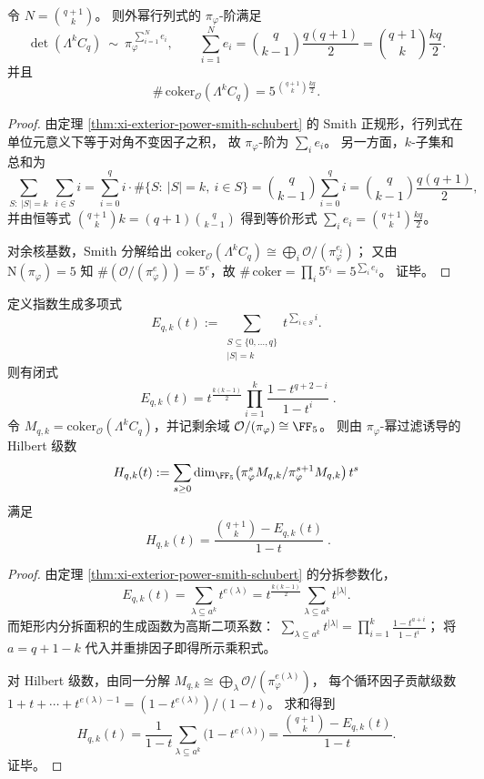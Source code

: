 \begin{proposition}[外幂行列式指数与余核基数]\label{prop:xi-exterior-power-det-coker-size}
令 \(N=\binom{q+1}{k}\)。
则外幂行列式的 \(\pi_\varphi\)-阶满足
\[
\det(\Lambda^k C_q)\ \sim\ \pi_\varphi^{\,\sum_{i=1}^{N}e_i},
\qquad
\sum_{i=1}^{N}e_i=\binom{q}{k-1}\frac{q(q+1)}{2}
=\binom{q+1}{k}\frac{kq}{2}.
\]
并且
\[
\#\,\mathrm{coker}_{\mathcal O}(\Lambda^k C_q)=5^{\,\binom{q+1}{k}\frac{kq}{2}}.
\]
\end{proposition}
\begin{proof}
由定理 \ref{thm:xi-exterior-power-smith-schubert} 的 Smith 正规形，行列式在单位元意义下等于对角不变因子之积，
故 \(\pi_\varphi\)-阶为 \(\sum_i e_i\)。
另一方面，\(k\)-子集和总和为
\[
\sum_{S:\ |S|=k}\ \sum_{i\in S} i
=\sum_{i=0}^{q} i\cdot \#\{S:\ |S|=k,\ i\in S\}
=\binom{q}{k-1}\sum_{i=0}^{q} i
=\binom{q}{k-1}\frac{q(q+1)}{2},
\]
并由恒等式 \(\binom{q+1}{k}k=(q+1)\binom{q}{k-1}\) 得到等价形式
\(\sum_i e_i=\binom{q+1}{k}\frac{kq}{2}\)。
\par
对余核基数，Smith 分解给出
\(
\mathrm{coker}_{\mathcal O}(\Lambda^k C_q)\cong \bigoplus_i \mathcal O/(\pi_\varphi^{e_i})
\)；
又由 \(\mathrm N(\pi_\varphi)=5\) 知 \(\#(\mathcal O/(\pi_\varphi^{e}))=5^{e}\)，故
\(
\#\,\mathrm{coker}=\prod_i 5^{e_i}=5^{\sum_i e_i}
\)。
证毕。
\end{proof}

\begin{proposition}\label{prop:xi-exterior-power-gaussian-binom-hilbert}
定义指数生成多项式
\[
E_{q,k}(t):=\sum_{\substack{S\subseteq\{0,\dots,q\}\\ |S|=k}} t^{\sum_{i\in S} i}.
\]
则有闭式
\[
\boxed{\;
E_{q,k}(t)=t^{\frac{k(k-1)}{2}}\prod_{i=1}^{k}\frac{1-t^{q+2-i}}{1-t^{i}}\; }.
\]
令 \(M_{q,k}=\mathrm{coker}_{\mathcal O}(\Lambda^k C_q)\)，并记剩余域 \(\mathcal O/(\pi_\varphi)\cong\FF_5\)。
则由 \(\pi_\varphi\)-幂过滤诱导的 Hilbert 级数
\[
H_{q,k}(t):=\sum_{s\ge 0}\dim_{\FF_5}\bigl(\pi_\varphi^{s}M_{q,k}/\pi_\varphi^{s+1}M_{q,k}\bigr)\,t^{s}
\]
满足
\[
\boxed{\;
H_{q,k}(t)=\frac{\binom{q+1}{k}-E_{q,k}(t)}{1-t}\; }.
\]
\end{proposition}
\begin{proof}
由定理 \ref{thm:xi-exterior-power-smith-schubert} 的分拆参数化，
\[
E_{q,k}(t)
=\sum_{\lambda\subseteq a^k} t^{e(\lambda)}
=t^{\frac{k(k-1)}{2}}\sum_{\lambda\subseteq a^k} t^{|\lambda|}.
\]
而矩形内分拆面积的生成函数为高斯二项系数：
\(
\sum_{\lambda\subseteq a^k} t^{|\lambda|}
=\prod_{i=1}^{k}\frac{1-t^{a+i}}{1-t^{i}}
\)；
将 \(a=q+1-k\) 代入并重排因子即得所示乘积式。
\par
对 Hilbert 级数，由同一分解 \(M_{q,k}\cong\bigoplus_{\lambda}\mathcal O/(\pi_\varphi^{e(\lambda)})\)，
每个循环因子贡献级数 \(1+t+\cdots+t^{e(\lambda)-1}=(1-t^{e(\lambda)})/(1-t)\)。
求和得到
\[
H_{q,k}(t)=\frac{1}{1-t}\sum_{\lambda\subseteq a^k}\bigl(1-t^{e(\lambda)}\bigr)
=\frac{\binom{q+1}{k}-E_{q,k}(t)}{1-t}.
\]
证毕。
\end{proof}

